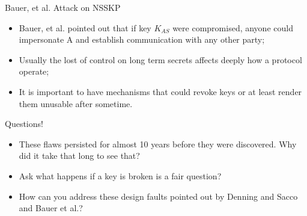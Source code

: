 \documentclass[12pt,table,xcolor={dvipsnames}]{beamer}
\begin{document}
\begin{frame}{Bauer, et al. Attack on NSSKP}
\begin{itemize}
\item Bauer, et al. pointed out that if key $K_{AS}$ were compromised, anyone could impersonate A and establish communication with any other party;\pause
\item Usually the lost of control on long term secrets affects deeply how a protocol operate;\pause
\item It is important to have mechanisms that could revoke keys or at least render them unusable after sometime.
\end{itemize}
\end{frame}

\begin{frame}{Questions!}
\begin{itemize}
\item These flaws persisted for almost 10 years before they were discovered. Why did it take that long to see that?\pause
\item Ask what happens if a key is broken is a fair question?\pause
\item How can you address these design faults pointed out by Denning and Sacco and Bauer et al.?
\end{itemize}
\end{frame}


\end{document}
